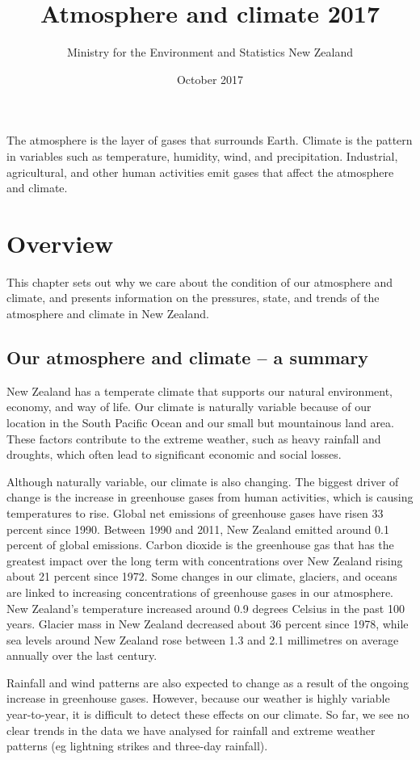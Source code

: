 \documentclass[11pt]{mfe-nzers} %
\title{Atmosphere and climate 2017}{Atmosphere and climate 2017}
\author{Ministry for the Environment and Statistics New Zealand}
\date{October 2017} %
\begin{document}
\maketitle
The atmosphere is the layer of gases that surrounds Earth. Climate is the pattern in variables such as temperature, humidity, wind, and precipitation. Industrial, agricultural, and other human activities emit gases that affect the atmosphere and climate.

\section{Overview}
This chapter sets out why we care about the condition of our atmosphere and climate, and presents information on the pressures, state, and trends of the atmosphere and climate in New Zealand.

\subsection{Our atmosphere and climate – a summary}
New Zealand has a temperate climate that supports our natural environment, economy, and way of life. Our climate is naturally variable because of our location in the South Pacific Ocean and our small but mountainous land area. These factors contribute to the extreme weather, such as heavy rainfall and droughts, which often lead to significant economic and social losses.

Although naturally variable, our climate is also changing. The biggest driver of change is the increase in greenhouse gases from human activities, which is causing temperatures to rise. Global net emissions of greenhouse gases have risen 33 percent since 1990. Between 1990 and 2011, New Zealand emitted around 0.1 percent of global emissions. Carbon dioxide is the greenhouse gas that has the greatest impact over the long term with concentrations over New Zealand rising about 21 percent since 1972. Some changes in our climate, glaciers, and oceans are linked to increasing concentrations of greenhouse gases in our atmosphere. New Zealand’s temperature increased around 0.9 degrees Celsius in the past 100 years. Glacier mass in New Zealand decreased about 36 percent since 1978, while sea levels around New Zealand rose between 1.3 and 2.1 millimetres on average annually over the last century.

Rainfall and wind patterns are also expected to change as a result of the ongoing increase in greenhouse gases. However, because our weather is highly variable year-to-year, it is difficult to detect these effects on our climate. So far, we see no clear trends in the data we have analysed for rainfall and extreme weather patterns (eg lightning strikes and three-day rainfall).
\end{document}
